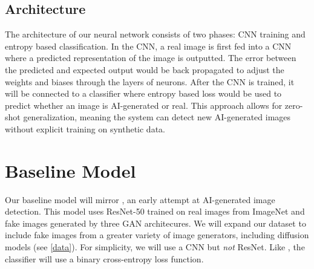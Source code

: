\documentclass{article} %
\begin{document}
\subsection{Architecture}
The architecture of our neural network consists of two phases: CNN training and entropy based classification. In the CNN, a real image is first fed into a CNN where a predicted representation of the image is outputted. The error between the predicted and expected output would be back propagated to adjust the weights and biases through the layers of neurons. After the CNN is trained, it will be connected to a classifier where entropy based loss would be used to predict whether an image is AI-generated or real. This approach allows for zero-shot generalization, meaning the system can detect new AI-generated images without explicit training on synthetic data.




\section{Baseline Model}
\label{baseline}

Our baseline model will mirror \citet{wang2020cnngeneratedimagessurprisinglyeasy}, an early attempt at AI-generated image detection. This model uses ResNet-50 trained on real images from ImageNet and fake images generated by three GAN architecures. We will expand our dataset to include fake images from a greater variety of image generators, including diffusion models (see \ref{data}). For simplicity, we will use a CNN but \textit{not} ResNet. Like \citet{wang2020cnngeneratedimagessurprisinglyeasy}, the classifier will use a binary cross-entropy loss function.
\end{document}
